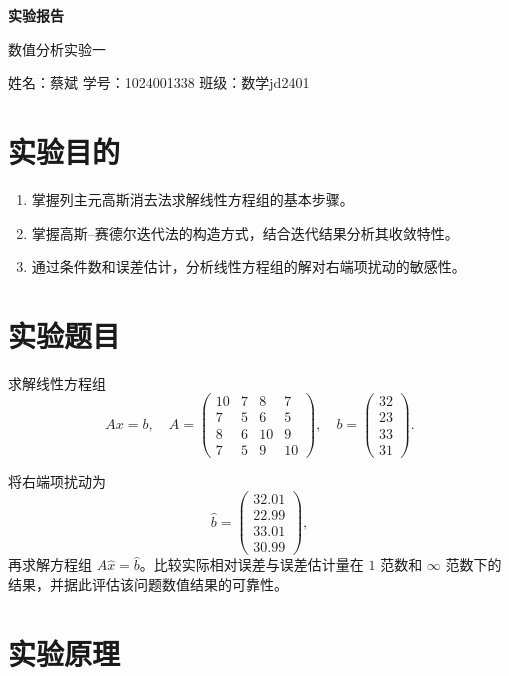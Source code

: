 \documentclass[12pt,a4paper]{ctexart}
\begin{document}
\thispagestyle{empty}

\begin{center}
    {\bfseries 实验报告}

    \vspace{0.7em}
    {数值分析实验一}

    \vspace{1em}
    姓名：蔡斌 \qquad 学号：1024001338 \qquad 班级：\mbox{数学jd2401}
\end{center}

\section{实验目的}

\begin{enumerate}
    \item 掌握列主元高斯消去法求解线性方程组的基本步骤。
    \item 掌握高斯--赛德尔迭代法的构造方式，结合迭代结果分析其收敛特性。
    \item 通过条件数和误差估计，分析线性方程组的解对右端项扰动的敏感性。
\end{enumerate}

\section{实验题目}

求解线性方程组
\[
A x = b,
\quad
A=
\begin{pmatrix}
10&7&8&7\\
7&5&6&5\\
8&6&10&9\\
7&5&9&10
\end{pmatrix},
\quad
b=
\begin{pmatrix}
32\\23\\33\\31
\end{pmatrix}.
\]

将右端项扰动为
\[
\hat{b}=
\begin{pmatrix}
32.01\\22.99\\33.01\\30.99
\end{pmatrix},
\]
再求解方程组 $A\hat{x}=\hat{b}$。比较实际相对误差与误差估计量在 $1$ 范数和 $\infty$ 范数下的结果，并据此评估该问题数值结果的可靠性。

\section{实验原理}
\end{document}
